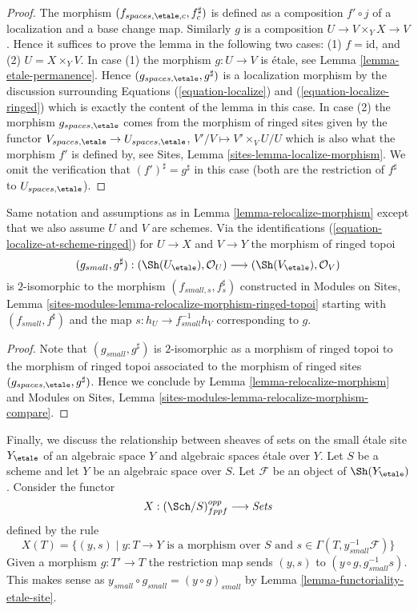 \begin{proof}
The morphism $(f_{spaces, \etale, c}, f_c^\sharp)$ is defined as a
composition $f' \circ j$
of a localization and a base change map. Similarly $g$ is a composition
$U \to V \times_Y X \to V$. Hence it suffices to prove
the lemma in the following two cases: (1) $f = \text{id}$, and
(2) $U = X \times_Y V$. In case (1) the morphism $g : U \to V$ is
\'etale, see
Lemma \ref{lemma-etale-permanence}.
Hence $(g_{spaces, \etale}, g^\sharp)$ is a localization morphism
by the discussion surrounding
Equations (\ref{equation-localize}) and
(\ref{equation-localize-ringed})
which is exactly the content of the lemma in this case.
In case (2) the morphism $g_{spaces, \etale}$
comes from the morphism of ringed sites given by the functor
$V_{spaces, \etale} \to U_{spaces, \etale}$,
$V'/V \mapsto V' \times_V U/U$
which is also what the morphism $f'$ is defined by, see
Sites, Lemma \ref{sites-lemma-localize-morphism}.
We omit the verification that $(f')^\sharp = g^\sharp$
in this case (both are the restriction of $f^\sharp$
to $U_{spaces, \etale}$).
\end{proof}

\begin{lemma}
\label{lemma-relocalize-morphism-at-schemes}
Same notation and assumptions as in
Lemma \ref{lemma-relocalize-morphism}
except that we also assume $U$ and $V$ are schemes.
Via the identifications
(\ref{equation-localize-at-scheme-ringed})
for $U \to X$ and $V \to Y$ the morphism of ringed topoi
$$
(g_{small}, g^\sharp) :
(\Sh(U_\etale), \mathcal{O}_U)
\longrightarrow
(\Sh(V_\etale), \mathcal{O}_V)
$$
is $2$-isomorphic to the morphism $(f_{small, s}, f_s^\sharp)$
constructed in
Modules on Sites,
Lemma \ref{sites-modules-lemma-relocalize-morphism-ringed-topoi}
starting with $(f_{small}, f^\sharp)$ and
the map $s : h_U \to f_{small}^{-1}h_V$ corresponding to $g$.
\end{lemma}

\begin{proof}
Note that $(g_{small}, g^\sharp)$ is $2$-isomorphic as a
morphism of ringed topoi to the morphism of ringed topoi
associated to the morphism of ringed sites
$(g_{spaces, \etale}, g^\sharp)$. Hence we conclude by
Lemma \ref{lemma-relocalize-morphism}
and
Modules on Sites,
Lemma \ref{sites-modules-lemma-relocalize-morphism-compare}.
\end{proof}

\noindent
Finally, we discuss the relationship between sheaves of sets on the small
\'etale site $Y_\etale$ of an algebraic space $Y$ and algebraic spaces
\'etale over $Y$. Let $S$ be a scheme and let $Y$ be an algebraic space
over $S$. Let $\mathcal{F}$ be an object of $\Sh(Y_\etale)$. Consider
the functor
$$
X : (\Sch/S)_{fppf}^{opp} \longrightarrow \textit{Sets}
$$
defined by the rule
$$
X(T) = \{(y, s) \mid y : T \to Y\text{ is a morphism over }S\text{ and }
s \in \Gamma(T, y_{small}^{-1}\mathcal{F})\}
$$
Given a morphism $g : T' \to T$ the restriction map sends
$(y, s)$ to $(y \circ g, g_{small}^{-1}s)$. This makes sense
as $y_{small} \circ g_{small} = (y \circ g)_{small}$ by
Lemma \ref{lemma-functoriality-etale-site}.

